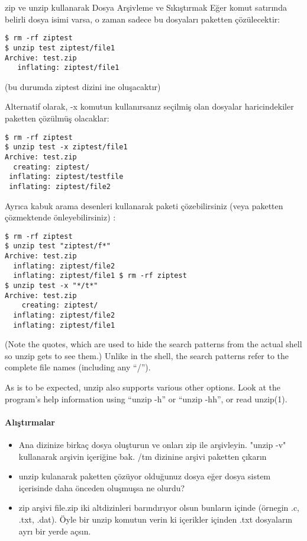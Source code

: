 \begin{section}{zip ve unzip kullanarak Dosya Arşivleme ve Sıkıştırmak}
Eğer komut satırında belirli dosya isimi varsa, o zaman sadece bu dosyaları paketten çözülecektir:
\begin{verbatim}
$ rm -rf ziptest
$ unzip test ziptest/file1 
Archive: test.zip
   inflating: ziptest/file1
\end{verbatim}
(bu durumda ziptest dizini ine oluşacaktır)

Alternatif olarak, -x komutun kullanırsanız seçilmiş olan dosyalar haricindekiler paketten çözülmüş olacaklar:
\begin{verbatim}
$ rm -rf ziptest
$ unzip test -x ziptest/file1 
Archive: test.zip
  creating: ziptest/ 
 inflating: ziptest/testfile
 inflating: ziptest/file2
\end{verbatim}
Ayrıca kabuk arama desenleri kullanarak paketi çözebilirsiniz (veya paketten çözmektende önleyebilirsiniz) :
\begin{verbatim}
$ rm -rf ziptest
$ unzip test "ziptest/f*" 
Archive: test.zip
  inflating: ziptest/file2
  inflating: ziptest/file1 $ rm -rf ziptest
$ unzip test -x "*/t*" 
Archive: test.zip
    creating: ziptest/ 
  inflating: ziptest/file2 
  inflating: ziptest/file1
\end{verbatim}

(Note the quotes, which are used to hide the search patterns from the actual shell so unzip gets to see them.) Unlike in the shell, the search patterns refer to the complete file names (including any “/”).

As is to be expected, unzip also supports various other options. Look at the program’s help information using “unzip -h” or “unzip -hh”, or read unzip(1).

\paragraph{Alıştırmalar}{
\begin{itemize}
 \item Ana dizinize birkaç dosya oluşturun ve onları zip ile arşivleyin. "unzip -v" kullanarak arşivin içeriğine bak. /tm dizinine arşivi paketten çıkarın
 \item unzip kulanarak paketten çözüyor olduğunuz dosya eğer dosya sistem içerisinde daha önceden oluşmuşsa ne olurdu?
 \item zip arşivi file.zip iki altdizinleri barındırıyor olsun bunların içinde (örnegin .c, .txt, .dat). Öyle bir unzip komutun verin ki içerikler içinden .txt dosyaların ayrı bir yerde açsın.
\end{itemize}}
\end{section}
